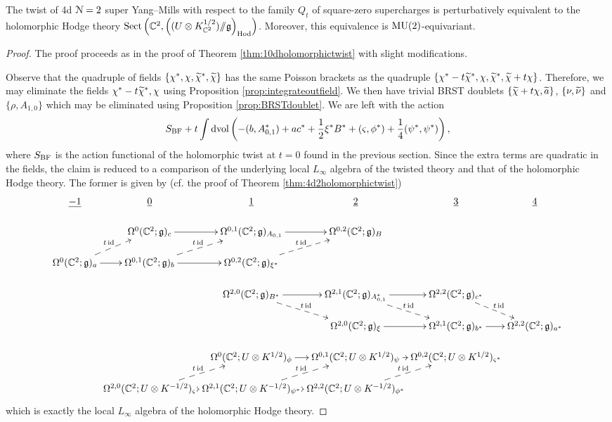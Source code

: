 \documentclass[10pt, oneside]{article}
\begin{document}
\begin{theorem}
The twist of 4d $\mathcal N=2$ super Yang--Mills with respect to the family $Q_t$ of square-zero supercharges is perturbatively equivalent to the holomorphic Hodge theory $\mathrm{Sect}\left(\mathbb C^2, \left((U\otimes K_{\mathbb C^2}^{1/2})/\!\!/ \mathfrak g\right)_{\mathrm{Hod}}\right)$. Moreover, this equivalence is $\mathrm{MU}(2)$-equivariant.
\label{thm:4dDonaldsontwist}
\end{theorem}
\begin{proof}
The proof proceeds as in the proof of Theorem \ref{thm:10dholomorphictwist} with slight modifications.

Observe that the quadruple of fields $\{\chi^*, \chi, \widetilde{\chi}^*, \widetilde{\chi}\}$ has the same Poisson brackets as the quadruple $\{\chi^*-t\widetilde{\chi}^*, \chi, \widetilde{\chi}^*, \widetilde{\chi} + t\chi\}$. Therefore, we may eliminate the fields $\chi^*-t\widetilde{\chi}^*, \chi$ using Proposition \ref{prop:integrateoutfield}. We then have trivial BRST doublets $\{\widetilde{\chi} + t\chi, \widetilde{a}\}$, $\{\nu, \widetilde{\nu}\}$ and $\{\rho, A_{1, 0}\}$ which may be eliminated using Proposition \ref{prop:BRSTdoublet}. We are left with the action
\begin{equation}\label{eqn:(2,0)}
S_{\mathrm{BF}} + t \int\operatorname{dvol}\left(-(b, A_{0, 1}^*) + a c^* + \frac{1}{2} \xi^* B^* + (\varsigma, \phi^*) + \frac 14 (\psi^*, \psi^*) \right),
\end{equation}
where $S_{\mathrm{BF}}$ is the action functional of the holomorphic twist at $t=0$ found in the previous section. 
Since the extra terms are quadratic in the fields, the claim is reduced to a comparison of the underlying local $L_\infty$ algebra of the twisted theory and that of the holomorphic Hodge theory. The former is given by (cf. the proof of Theorem \ref{thm:4d2holomorphictwist})
\[
\xymatrix@R=0.5cm@C=0cm{
\ul{-1} & \ul{0} & \ul{1} & \ul{2} & \ul{3} & \ul{4} \\ 
& \Omega^0(\CC^2; \gg)_c \ar[r] &\Omega^{0,1}(\CC^2; \gg)_{A_{0,1}} \ar[r] &\Omega^{0,2}(\CC^2; \gg)_{B} \\
\Omega^0(\CC^2; \gg)_a  \ar@{-->}^{t\id}[ur] \ar[r] &\Omega^{0,1}(\CC^2; \gg)_{b}  \ar@{-->}^{t\id}[ur] \ar[r] &\Omega^{0,2}(\CC^2; \gg)_{\xi^*}  \ar@{-->}^{t\id}[ur] \\
& &  \Omega^{2,0}(\CC^2 ; \gg)_{B^*}  \ar@{-->}^{t\id}[dr] \ar[r] & \Omega^{2,1}(\CC^2 ; \gg)_{A_{0,1}^*} \ar[r]  \ar@{-->}^{t\id}[dr] & \Omega^{2,2}(\CC^2 ; \gg)_{c^*}  \ar@{-->}^{t\id}[dr] \\
& & & \Omega^{2,0}(\CC^2; \gg)_\xi \ar[r] &\Omega^{2,1}(\CC^2; \gg)_{b^*} \ar[r] &\Omega^{2,2}(\CC^2; \gg)_{a^*}  \\
& & \Omega^0(\CC^2 ; U\otimes K^{1/2})_\phi \ar[r] & \Omega^{0,1}(\CC^2 ; U\otimes K^{1/2})_\psi \ar[r] & \Omega^{0,2}(\CC^2 ; U\otimes K^{1/2})_{\varsigma^*} \\
& \Omega^{2,0}(\CC^2 ; U\otimes K^{-1/2})_{\varsigma} \ar[r]  \ar@{-->}^{t\id}[ur] & \Omega^{2,1}(\CC^2 ; U\otimes K^{-1/2})_{\psi^*} \ar[r]  \ar@{-->}^{t\id}[ur]  & \Omega^{2,2}(\CC^2 ; U\otimes K^{-1/2})_{\phi^*}  \ar@{-->}^{t\id}[ur]
}
\]
which is exactly the local $L_\infty$ algebra of the holomorphic Hodge theory.
\end{proof}
\end{document}
